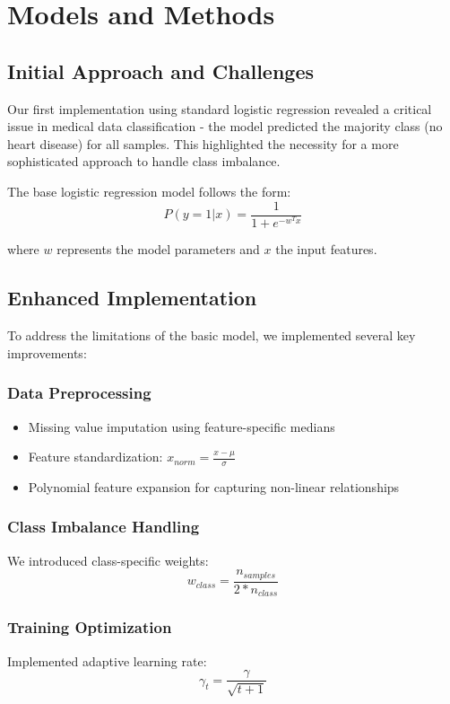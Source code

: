 \documentclass[10pt,conference,compsocconf]{IEEEtran}
\begin{document}
\section{Models and Methods}

\subsection{Initial Approach and Challenges}
Our first implementation using standard logistic regression revealed a critical
issue in medical data classification - the model predicted the majority class (no heart disease)
for all samples. This highlighted the necessity for a more sophisticated approach to handle
class imbalance.

The base logistic regression model follows the form:
\begin{equation}
    P(y=1|x) = \frac{1}{1 + e^{-w^Tx}}
\end{equation}

where $w$ represents the model parameters and $x$ the input features.

\subsection{Enhanced Implementation}
To address the limitations of the basic model, we implemented several key improvements:

\subsubsection{Data Preprocessing}
\begin{itemize}
    \item Missing value imputation using feature-specific medians
    \item Feature standardization: $x_{norm} = \frac{x - \mu}{\sigma}$
    \item Polynomial feature expansion for capturing non-linear relationships
\end{itemize}

\subsubsection{Class Imbalance Handling}
We introduced class-specific weights:
\begin{equation}
    w_{class} = \frac{n_{samples}}{2 * n_{class}}
\end{equation}

\subsubsection{Training Optimization}
Implemented adaptive learning rate:
\begin{equation}
    \gamma_t = \frac{\gamma}{\sqrt{t + 1}}
\end{equation}
\end{document}
